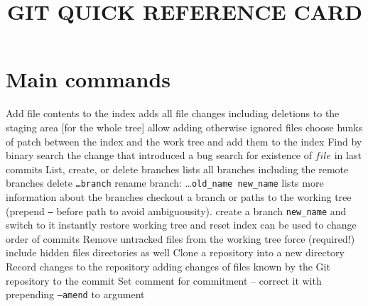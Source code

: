 

\def\versionnumber{1.1}  %
\def\year{2014}
\def\month{May}
\def\version{v\versionnumber\ \month\ \year}


\bye

\title{GIT QUICK REFERENCE CARD}

\shortintro

\section{Main commands}{}
	{Add file contents to the index}
	{adds all file changes including deletions to the staging area [for the whole tree]}
	{allow adding otherwise ignored files}
	{choose hunks of patch between the index and the work tree and add them to the index}
	{Find by binary search the change that introduced a bug}
	{search for existence of $file$ in last commits}
	{List, create, or delete branches}
	{lists all branches including the remote branches}
	{delete {\tt \dots branch}}
	{rename branch: \dots {\tt old\_name new\_name}}
	{lists more information about the branches}
	{checkout a branch or paths to the working tree (prepend {\tt --} before path to avoid ambiguousity).}
	{create a branch {\tt new\_name} and switch to it instantly}
	{restore working tree and reset index}
	{can be used to change order of commits}
	{Remove untracked files from the working tree}
	{force (required!)}
	{include hidden files}
	{directories as well}
	{Clone a repository into a new directory}
	{Record changes to the repository}
	{adding changes of files known by the Git repository to the commit}
	{Set comment for commitment -- correct it with prepending {\tt --amend} to argument}

